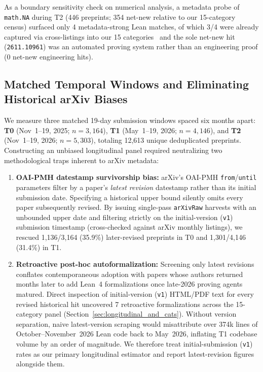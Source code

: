 \documentclass[11pt,letterpaper]{article}
\begin{document}
As a boundary sensitivity check on numerical analysis, a metadata probe of \texttt{math.NA} during T2 (446 preprints; 354 net-new relative to our 15-category census) surfaced only 4 metadata-strong Lean matches, of which 3/4 were already captured via cross-listings into our 15 categories~\cite{arxiv2611_13584,arxiv2611_12585,arxiv2611_11805} and the sole net-new hit (\texttt{2611.10961}) was an automated proving system rather than an engineering proof (0 net-new engineering hits).

\subsection{Matched Temporal Windows and Eliminating Historical arXiv Biases}
\label{sec:temporal_biases}

We measure three matched 19-day submission windows spaced six months apart: \textbf{T0} (Nov~1--19, 2025; $n = 3{,}164$), \textbf{T1} (May~1--19, 2026; $n = 4{,}146$), and \textbf{T2} (Nov~1--19, 2026; $n = 5{,}303$), totaling 12,613 unique deduplicated preprints. Constructing an unbiased longitudinal panel required neutralizing two methodological traps inherent to arXiv metadata:
\begin{enumerate}
  \item \textbf{OAI-PMH datestamp survivorship bias:} arXiv's OAI-PMH \texttt{from}/\texttt{until} parameters filter by a paper's \emph{latest revision} datestamp rather than its initial submission date. Specifying a historical upper bound silently omits every paper subsequently revised. By issuing single-pass \texttt{arXivRaw} harvests with an unbounded upper date and filtering strictly on the initial-version (\texttt{v1}) submission timestamp (cross-checked against arXiv monthly listings), we rescued 1,136/3,164 (35.9\%) later-revised preprints in T0 and 1,301/4,146 (31.4\%) in T1.
  \item \textbf{Retroactive post-hoc autoformalization:} Screening only latest revisions conflates contemporaneous adoption with papers whose authors returned months later to add Lean~4 formalizations once late-2026 proving agents matured. Direct inspection of initial-version (\texttt{v1}) HTML/PDF text for every revised historical hit uncovered 7 retroactive formalizations across the 15-category panel (Section~\ref{sec:longitudinal_and_cats}). Without version separation, naive latest-version scraping would misattribute over 374k lines of October--November~2026 Lean code back to May~2026, inflating T1 codebase volume by an order of magnitude. We therefore treat initial-submission (\texttt{v1}) rates as our primary longitudinal estimator and report latest-revision figures alongside them.
\end{enumerate}
\end{document}
